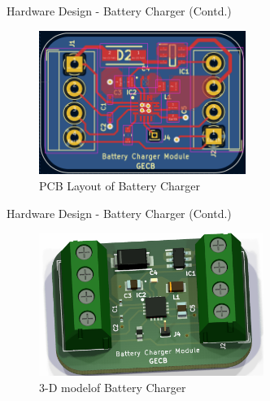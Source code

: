 \documentclass[aspectratio=169]{beamer}
\begin{document}
\begin{frame}{Hardware Design - Battery Charger (Contd.) }
	\begin{figure}[h]
		\centering
		\includegraphics[width=0.6\textwidth]{diag/charg pcb.png}
		\caption{PCB Layout of Battery Charger}
		\label{fig:mesh1}
	\end{figure}
\end{frame}
\begin{frame}{Hardware Design - Battery Charger (Contd.) }
	\begin{figure}[h]
		\centering
		\includegraphics[width=0.65\textwidth]{diag/charg 3d.png}
		\caption{3-D modelof Battery Charger}
		\label{fig:mesh1}
	\end{figure}
\end{frame}
\end{document}

